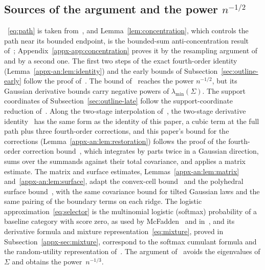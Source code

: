 \documentclass[11pt,letterpaper]{article}
\newif\ifshowlin
\newcommand{\lin}[1]{\ifshowlin{\color{revblue}%
\hypersetup{linkcolor=revblue,citecolor=revblue,urlcolor=revblue}#1}\else#1\fi}
\newcommand{\lns}[1]{\ifshowlin{\color{revblue}#1}\else#1\fi}
\newif\ifshowskill
\newcommand{\skl}[1]{\ifshowskill{\color{revblue}%
\hypersetup{linkcolor=revblue,citecolor=revblue,urlcolor=revblue}#1}\else#1\fi}
\newif\ifshownat
\newcommand{\nat}[1]{\ifshownat{\color{revblue}%
\hypersetup{linkcolor=revblue,citecolor=revblue,urlcolor=revblue}#1}\else#1\fi}
\theoremstyle{remark}
\begin{document}
\subsection{\texorpdfstring{\lns{Sources of the argument and the power \(n^{-1/2}\)}}{Sources of the argument and the power n to the -1/2}}
\label{sec:why-rate}\label{sec:sources}
\lin{~\eqref{eq:path} is \nat{taken from}~\cite[\skl{Section~4, the display after eq.~(16)}]{AL}, and
Lemma~\ref{lem:concentration}, which controls the path near its bounded
endpoint, is \nat{the bounded-sum anti-concentration result of~\cite[Lemma~2.1]{AL}}; Appendix~\ref{appx-app:concentration} proves it \nat{by the resampling argument of~\cite{AL}} and by a second one. The first two
steps of \nat{the exact fourth-order identity}
(Lemma~\ref{appx-an:lem:identity}) and the early bounds of
Subsection~\ref{sec:outline-early} follow \nat{the proof of~\cite[Lemma~4.1]{AL}. The bound of~\cite{AL} reaches the power \(n^{-1/2}\), but its Gaussian derivative bounds carry negative powers of} \(\lambda_{\min}(\Sigma)\).
The support coordinates of Subsection~\ref{sec:outline-late} follow \nat{the support-coordinate reduction of~\cite[Section~2.3]{GaoZhang}. Along the two-stage interpolation of~\cite{GaoZhang}, the two-stage derivative identity~\cite[Lemma~22]{GaoZhang} has the same form as the identity of this paper},
a cubic term at the full path plus three fourth-order corrections, and \nat{this paper's bound for the corrections} (Lemma~\ref{appx-an:lem:restoration}) \nat{follows the proof of the fourth-order correction bound~\cite[Lemma~23]{GaoZhang}}, which integrates by parts twice in a
Gaussian direction, sums over the summands against their total
covariance, and applies a matrix estimate. \nat{The matrix and surface} estimates, Lemmas~\ref{appx-an:lem:matrix} and~\ref{appx-an:lem:surface}, \nat{adapt the convex-cell bound~\cite[Lemma~12]{GaoZhang} and the polyhedral surface bound~\cite[Proposition~4]{GaoZhang}},
with the same covariance bound for tilted Gaussian laws and the same
pairing of the boundary terms on each ridge. The logistic
approximation~\eqref{eq:selector} is the multinomial logistic (softmax)
probability of a baseline category with score zero, as used by
\skl{McFadden~\cite[p.~1001]{McFadden1989} and} \nat{in~\cite[eq.~(5)]{GaoZhang}}, and its derivative formula and
\skl{mixture representation~\eqref{eq:mixture}, proved in
Subsection~\ref{appx-sec:mixture}, correspond to} \nat{the softmax cumulant formula and the random-utility representation of~\cite[Lemmas~13 and~14]{GaoZhang}. The argument of~\cite{GaoZhang} avoids the eigenvalues of \(\Sigma\) and obtains the power~\(n^{-1/3}\).}}
\end{document}
